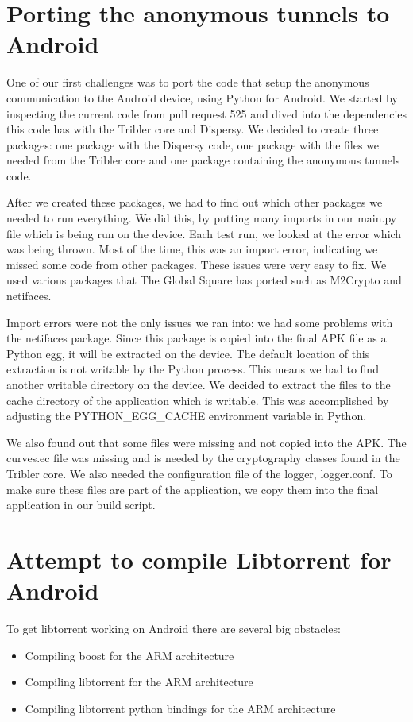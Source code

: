 \begin{itemize}
		\end{itemize}
	
	\section{Porting the anonymous tunnels to Android}
		One of our first challenges was to port the code that setup the anonymous communication to the Android device, using Python for Android. We started by inspecting the current code from pull request 525 and dived into the dependencies this code has with the Tribler core and Dispersy. We decided to create three packages: one package with the Dispersy code, one package with the files we needed from the Tribler core and one package containing the anonymous tunnels code.
		
		After we created these packages, we had to find out which other packages we needed to run everything. We did this, by putting many imports in our main.py file which is being run on the device. Each test run, we looked at the error which was being thrown. Most of the time, this was an import error, indicating we missed some code from other packages. These issues were very easy to fix. We used various packages that The Global Square has ported such as M2Crypto and netifaces.
		
		Import errors were not the only issues we ran into: we had some problems with the netifaces package. Since this package is copied into the final APK file as a Python egg, it will be extracted on the device. The default location of this extraction is not writable by the Python process. This means we had to find another writable directory on the device. We decided to extract the files to the cache directory of the application which is writable. This was accomplished by adjusting the PYTHON\_EGG\_CACHE environment variable in Python.
		
		We also found out that some files were missing and not copied into the APK. The curves.ec file was missing and is needed by the cryptography classes found in the Tribler core. We also needed the configuration file of the logger, logger.conf. To make sure these files are part of the application, we copy them into the final application in our build script.
		
	\section{Attempt to compile Libtorrent for Android}
		To get libtorrent working on Android there are several big obstacles:
		\begin{itemize}
			\item Compiling boost for the ARM architecture
			\item Compiling libtorrent for the ARM architecture
			\item Compiling libtorrent python bindings for the ARM architecture
		\end{itemize}
		
